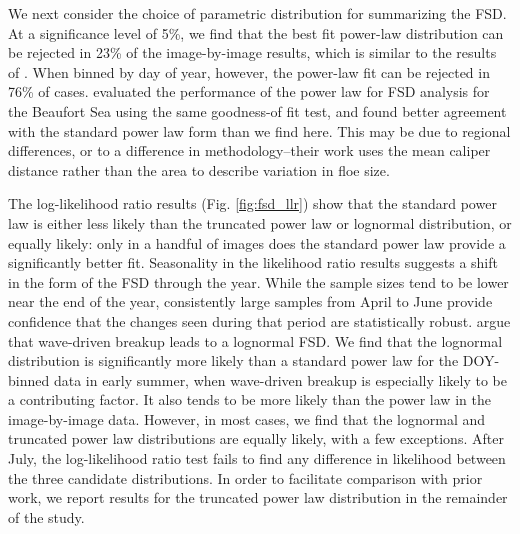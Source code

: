 \documentclass[aog]{igs}
\begin{document}
\begin{figure*}[!ht]
\caption{Log-likelihood ratios for image-by-image (top row) and DOY-binned (bottom row) FSD parametric distribution fits. In the figure titles, PL=power law, TPL=truncated power law, and LN=lognormal. Log likelihood ratios that are significantly different than zero after accounting for the false discovery rate are colored blue (image-by-image) or green (DOY-binned). Gray dots are not significantly different than zero. Positive values favor the distribution listed first, and negative values favor the distribution listed second, so for example in panel (a) the negative values favor the truncated power law over the standard power law.}
\label{fig:fsd_llr}
\end{figure*}

We next consider the choice of parametric distribution for summarizing the FSD.
At a significance level of 5\%, we find that the best fit power-law distribution can be rejected in 23\% of the image-by-image results, which is similar to the results of \citep{hwang2017_WintertosummerTransition}. When binned by day of year, however, the power-law fit can be rejected in 76\% of cases.
\cite{stern2018_SeasonalEvolution} evaluated the performance of the power law for FSD analysis for the Beaufort Sea using the same goodness-of fit test, and found better agreement with the standard power law form than we find here. This may be due to regional differences, or to a difference in methodology--their work uses the mean caliper distance rather than the area to describe variation in floe size. 

The log-likelihood ratio results (Fig. \ref{fig:fsd_llr}) show that the standard power law is either less likely than the truncated power law or lognormal distribution, or equally likely: only in a handful of images does the standard power law provide a significantly better fit. 
Seasonality in the likelihood ratio results suggests a shift in the form of the FSD through the year.
While the sample sizes tend to be lower near the end of the year, consistently large samples from April to June provide confidence that the changes seen during that period are statistically robust.
\cite{mokus2022_WavetriggeredBreakup} argue that wave-driven breakup leads to a lognormal FSD. 
We find that the lognormal distribution is significantly more likely than a standard power law for the DOY-binned data in early summer, when wave-driven breakup is especially likely to be a contributing factor. It also tends to be more likely than the power law in the image-by-image data. However, in most cases, we find that the lognormal and truncated power law distributions are equally likely, with a few exceptions. After July, the log-likelihood ratio test fails to find any difference in likelihood between the three candidate distributions.
In order to facilitate comparison with prior work, we report results for the truncated power law distribution in the remainder of the study. 
\end{document}
